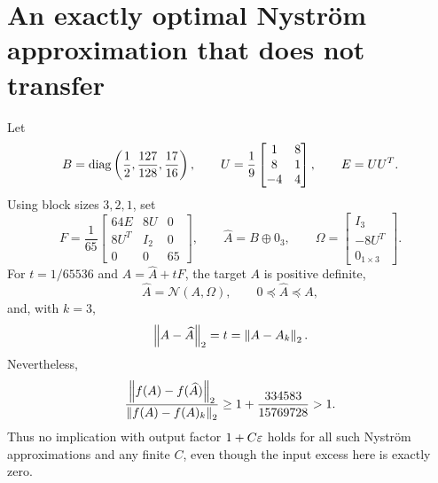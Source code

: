 \documentclass[11pt]{article}
\begin{document}
\section{An exactly optimal Nystr\"om approximation that does not transfer}
\begin{theorem}\label{thm:spectral}
Let
\[
 B=\operatorname{diag}\left(\frac12,\frac{127}{128},\frac{17}{16}\right),\qquad
 U=\frac19\begin{bmatrix}1&8\\8&1\\-4&4\end{bmatrix},\qquad E=UU^T.
\]
Using block sizes $3,2,1$, set
\[
 F=\frac1{65}\begin{bmatrix}
 64E&8U&0\\8U^T&I_2&0\\0&0&65
 \end{bmatrix},\qquad
 \widehat A=B\oplus0_3,\qquad
 \Omega=\begin{bmatrix}I_3\\-8U^T\\0_{1\times3}\end{bmatrix}.
\]
For $t=1/65536$ and $A=\widehat A+tF$, the target $A$ is positive definite,
\[
 \widehat A=\mathcal N(A,\Omega),\qquad
 0\preceq\widehat A\preceq A,
\]
and, with $k=3$,
\[
 \left\lVert A-\widehat A\right\rVert_2=t=\left\lVert A-A_k\right\rVert_2.
\]
Nevertheless,
\begin{equation}\label{eq:spectralratio}
 \frac{\left\lVert f(A)-f(\widehat A)\right\rVert_2}
      {\left\lVert f(A)-f(A)_k\right\rVert_2}
 \ge1+\frac{334583}{15769728}>1.
\end{equation}
Thus no implication with output factor $1+C\varepsilon$ holds for all such Nystr\"om approximations and any finite $C$, even though the input excess here is exactly zero.
\end{theorem}
\end{document}
